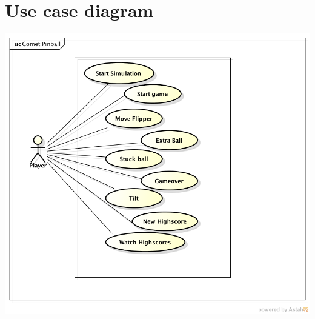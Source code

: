 \documentclass[fontsize=12pt,
               paper=a4,
               twoside=false,
               parskip=half,
               ]{scrartcl}
\begin{document}

\section{Use case diagram}


\includegraphics[width=15cm]{./img/usecase-model.png}
\end{document}
